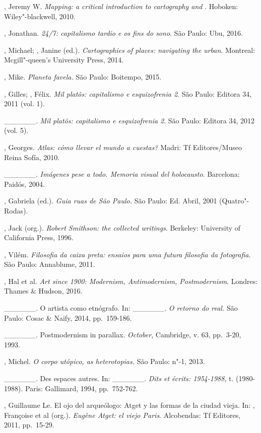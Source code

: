 \begin{Parskip}
, Jeremy W. \emph{Mapping: a critical introduction to
cartography and }. Hoboken: Wiley"-blackwell, 2010.

, Jonathan. \emph{24/7: capitalismo tardio e os fins do sono}.
São Paulo: Ubu, 2016.

, Michael; , Janine (ed.). \emph{Cartographies of
places: navigating the urban}. Montreal: Mcgill"-queen's University
Press, 2014.

, Mike. \emph{Planeta favela.} São Paulo: Boitempo, 2015.

, Gilles; , Félix. \emph{Mil platôs: capitalismo e
esquizofrenia 2}. São Paulo: Editora 34, 2011 (vol. 1).

\_\_\_\_\_\_. \emph{Mil platôs: capitalismo e esquizofrenia 2}.
São Paulo: Editora 34, 2012 (vol. 5).

, Georges. \emph{Atlas: cómo llevar el mundo a cuestas?}
Madri: Tf Editores/Museo Reina Sofía, 2010.

\_\_\_\_\_\_. \emph{Imágenes pese a todo. Memoria visual del holocausto}. Barcelona: Paidós, 2004.

, Gabriela (ed.). \emph{Guia ruas de São Paulo.} São Paulo: Ed.
Abril, 2001 (Quatro"-Rodas).

, Jack (org.). \emph{Robert Smithson: the collected writings}.
Berkeley: University of California Press, 1996.

, Vilém. \emph{Filosofia da caixa preta: ensaios para uma
futura filosofia da fotografia}. São Paulo: Annablume, 2011.

, Hal et al. \emph{Art since 1900: Modernism, Antimodernism,
Postmodernism}. Londres: Thames \& Hudson, 2016.

\_\_\_\_\_\_. O artista como etnógrafo. In: \_\_\_\_\_\_.
\emph{O retorno do real.} São Paulo: Cosac \& Naify, 2014, pp.~159-186.

\_\_\_\_\_\_. Postmodernism in parallax. \emph{October},
Cambridge, v. 63, pp.~3-20, 1993.

, Michel. \emph{O corpo utópico, as heterotopias.} São Paulo:
n"-1, 2013.

\_\_\_\_\_\_. Des espaces autres. In: \_\_\_\_\_\_. \emph{Dits
et écrits: 1954-1988}, t.  (1980-1988). Paris: Gallimard, 1994, pp.~752-762.

, Guillaume Le. El ojo del arqueólogo: Atget y las formas de la
ciudad vieja. In: , Françoise et al (org.). \emph{Eugène
Atget: el viejo Paris}. Alcobendas: Tf Editores, 2011, pp.~15-29.


\end{Parskip}
